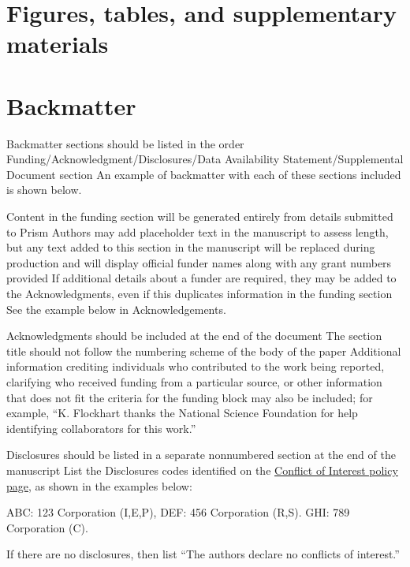 \documentclass{osa-article}
\begin{document}
\section{Figures, tables, and supplementary materials}



\section{Backmatter}

Backmatter sections should be listed in the order Funding/Acknowledgment/Disclosures/Data Availability Statement/Supplemental Document section
An example of backmatter with each of these sections included is shown below.

\begin{backmatter}
Content in the funding section will be generated entirely from details submitted to Prism
Authors may add placeholder text in the manuscript to assess length, but any text added to this section in the manuscript will be replaced during production and will display official funder names along with any grant numbers provided
If additional details about a funder are required, they may be added to the Acknowledgments, even if this duplicates information in the funding section
See the example below in Acknowledgements.

Acknowledgments should be included at the end of the document
The section title should not follow the numbering scheme of the body of the paper
Additional information crediting individuals who contributed to the work being reported, clarifying who received funding from a particular source, or other information that does not fit the criteria for the funding block may also be included; for example, ``K. Flockhart thanks the National Science Foundation for help identifying collaborators for this work.''

Disclosures should be listed in a separate nonnumbered section at the end of the manuscript
List the Disclosures codes identified on the \href{https://opg.optica.org/submit/review/conflicts-interest-policy.cfm}{Conflict of Interest policy page}, as shown in the examples below:

\medskip

\noindent ABC: 123 Corporation (I,E,P), DEF: 456 Corporation (R,S). GHI: 789 Corporation (C).

\medskip

\noindent If there are no disclosures, then list ``The authors declare no conflicts of interest.''



\end{backmatter}
\end{document}
